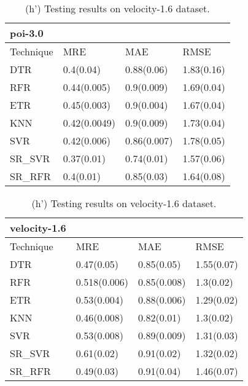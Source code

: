 \documentclass[]{article}
\begin{document}
	\begin{table}[h]
		\captionsetup[subtable]{labelformat=empty}
		\begin{adjustwidth}{-2.9cm}{}
			\begin{subtable}{9cm}
				\centering
				\caption{(g') Testing results on poi-3.0 dataset.}
				\label{tab:poi-wv}
				\begin{tabular}{llll}
					\hline
					poi-3.0 &&&\\ \hline
					Technique & MRE & MAE & RMSE\\  \hline
					DTR & 0.4(0.04) & 0.88(0.06) & 1.83(0.16)\\ 
					RFR & 0.44(0.005) & 0.9(0.009) & 1.69(0.04)\\ 
					ETR & 0.45(0.003) & 0.9(0.004) & 1.67(0.04)\\ 
					KNN & 0.42(0.0049) & 0.9(0.009) & 1.73(0.04)\\ 
					SVR & 0.42(0.006) & 0.86(0.007) & 1.78(0.05)\\ 
					SR\_SVR & 0.37(0.01) & 0.74(0.01) & 1.57(0.06)\\
					SR\_RFR & 0.4(0.01) & 0.85(0.03) & 1.64(0.08)\\ \hline
				\end{tabular}
			\end{subtable}
			\begin{subtable}{9cm}
				\centering
				\caption{(h') Testing results on velocity-1.6 dataset.}
				\label{tab:velocity-wv}
				\begin{tabular}{llll}
					\hline
					velocity-1.6 &&&\\ \hline
					Technique & MRE & MAE & RMSE\\  \hline
					DTR & 0.47(0.05) & 0.85(0.05) & 1.55(0.07)\\ 
					RFR & 0.518(0.006) & 0.85(0.008) & 1.3(0.02)\\ 
					ETR & 0.53(0.004) & 0.88(0.006) & 1.29(0.02)\\ 
					KNN & 0.46(0.008) & 0.82(0.01) & 1.3(0.02)\\ 
					SVR & 0.53(0.008) & 0.89(0.009) & 1.31(0.03)\\ 
					SR\_SVR & 0.61(0.02) & 0.91(0.02) & 1.32(0.02)\\
					SR\_RFR & 0.49(0.03) & 0.91(0.04) & 1.46(0.07)\\ \hline
				\end{tabular}
			\end{subtable} 
		\end{adjustwidth}
	\end{table}
\end{document}
